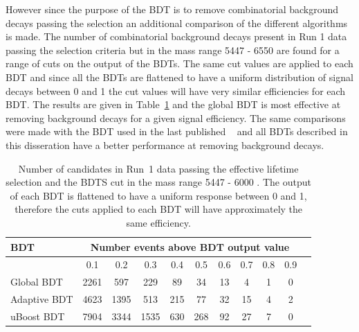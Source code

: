 However since the purpose of the BDT is to remove combinatorial background decays passing the \bsmumu selection an additional comparison of the different algorithms is made. The number of combinatorial background decays present in Run 1 data passing the \el selection criteria but in the mass range 5447 - 6550 \mevcc are found for a range of cuts on the output of the BDTs. %
The same cut values are applied to each BDT and since all the BDTs are flattened to have a uniform distribution of signal decays between 0 and 1 the cut values will have very similar efficiencies for each BDT. %
The results are given in Table~\ref{tab:bkgdsC} and the global BDT is most effective at removing background decays for a given signal efficiency.
The same comparisons were made with the BDT used in the last published \BFm~\cite{CMS:2014xfa, Aaij:2013aka} and all BDTs described in this disseration have a better performance at removing background decays. 




\begin{table}[htbp]
\begin{center}
\begin{tabular}{l|cccccccccc}
\hline
BDT & \multicolumn{9}{c}{Number events above BDT output value}  \\
\hline
   & 0.1 & 0.2 & 0.3 & 0.4 & 0.5 & 0.6 & 0.7 & 0.8 & 0.9 \\ \hline
Global BDT  & 2261 & 597 & 229 & 89 & 34 & 13 & 4 & 1 & 0 \\ 
Adaptive BDT  & 4623 & 1395 & 513 & 215 & 77 & 32 & 15 & 4 & 2 \\
uBoost BDT & 7904 & 3344 & 1535 &630 & 268 & 92 & 27 & 7 & 0 \\
\hline
\end{tabular}
\vspace{0.7cm}
\vspace{0.7cm}
\caption{Number of candidates in Run~1 data passing the effective lifetime selection and the BDTS cut in the mass range 5447 - 6000 \mevcc. The output of each BDT is flattened to have a uniform response between 0 and 1, therefore the cuts applied to each BDT will have approximately the same efficiency.}
\label{tab:bkgdsC}
\end{center}
\vspace{-1.0cm}
\end{table}



